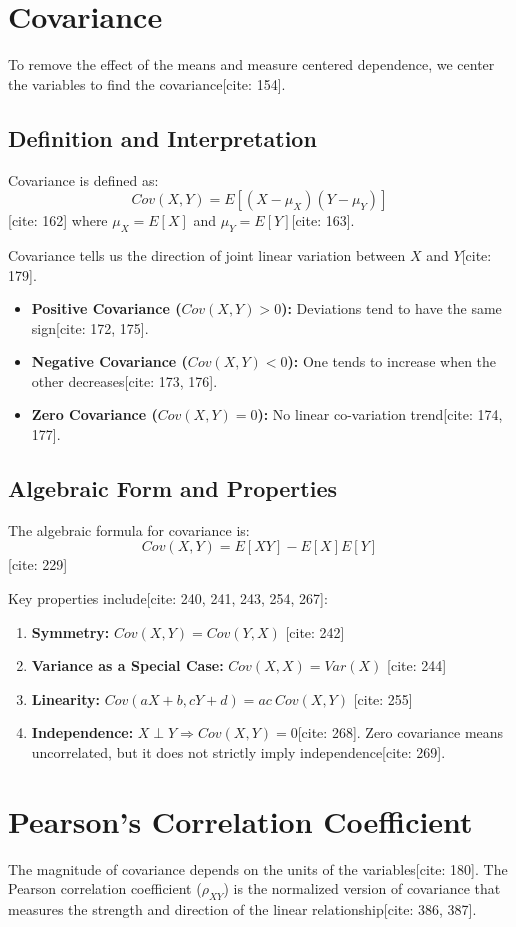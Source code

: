 \documentclass[11pt]{article}
\begin{document}
\section{Covariance}
To remove the effect of the means and measure centered dependence, we center the variables to find the covariance[cite: 154]. 

\subsection{Definition and Interpretation}
Covariance is defined as:
$$Cov(X,Y)=E[(X-\mu_{X})(Y-\mu_{Y})]$$ [cite: 162]
where $\mu_{X}=E[X]$ and $\mu_{Y}=E[Y]$[cite: 163].

Covariance tells us the direction of joint linear variation between $X$ and $Y$[cite: 179].
\begin{itemize}
    \item \textbf{Positive Covariance ($Cov(X,Y)>0$):} Deviations tend to have the same sign[cite: 172, 175].
    \item \textbf{Negative Covariance ($Cov(X,Y)<0$):} One tends to increase when the other decreases[cite: 173, 176].
    \item \textbf{Zero Covariance ($Cov(X,Y)=0$):} No linear co-variation trend[cite: 174, 177].
\end{itemize}

\subsection{Algebraic Form and Properties}
The algebraic formula for covariance is:
$$Cov(X,Y)=E[XY]-E[X]E[Y]$$ [cite: 229]

Key properties include[cite: 240, 241, 243, 254, 267]:
\begin{enumerate}
    \item \textbf{Symmetry:} $Cov(X,Y)=Cov(Y,X)$ [cite: 242]
    \item \textbf{Variance as a Special Case:} $Cov(X,X)=Var(X)$ [cite: 244]
    \item \textbf{Linearity:} $Cov(aX+b,cY+d)=ac~Cov(X,Y)$ [cite: 255]
    \item \textbf{Independence:} $X\perp Y\Rightarrow Cov(X,Y)=0$[cite: 268]. Zero covariance means uncorrelated, but it does not strictly imply independence[cite: 269].
\end{enumerate}

\section{Pearson's Correlation Coefficient}
The magnitude of covariance depends on the units of the variables[cite: 180]. The Pearson correlation coefficient ($\rho_{XY}$) is the normalized version of covariance that measures the strength and direction of the linear relationship[cite: 386, 387].
\end{document}
